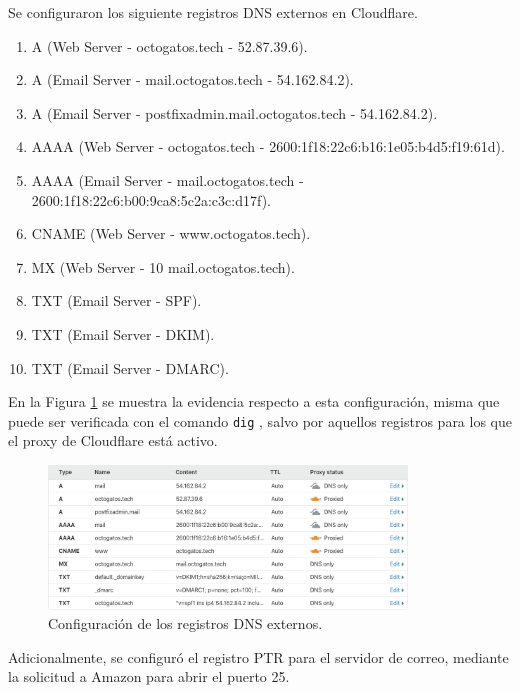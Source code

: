 \documentclass{article}
\newcommand{\ttt}[1]{%
\texttt{#1}%
}
\begin{document}
Se configuraron los siguiente registros DNS
externos en Cloudflare.
\begin{enumerate}
  \item A (Web Server - octogatos.tech - 52.87.39.6).

  \item A (Email Server - mail.octogatos.tech - 54.162.84.2).

  \item A (Email Server - postfixadmin.mail.octogatos.tech
                        - 54.162.84.2).

  \item AAAA (Web Server - octogatos.tech
                         - 2600:1f18:22c6:b16:1e05:b4d5:f19:61d).

  \item AAAA (Email Server - mail.octogatos.tech
                           - 2600:1f18:22c6:b00:9ca8:5c2a:c3c:d17f).

  \item CNAME (Web Server - www.octogatos.tech).

  \item MX (Web Server - 10 mail.octogatos.tech).

  \item TXT (Email Server - SPF).

  \item TXT (Email Server - DKIM).

  \item TXT (Email Server - DMARC).
\end{enumerate}
En la Figura \ref{fig:dnsExterno} se muestra la
evidencia respecto a esta configuraci\'on, misma
que puede ser verificada con el comando \ttt{dig},
salvo por aquellos registros para los que el proxy
de Cloudflare est\'a activo.
\begin{figure}[H]
  \centering
  \includegraphics[width=0.85\textwidth]{DNS/dnsExterno}
  \caption{Configuraci\'on de los registros DNS externos.}
  \label{fig:dnsExterno}
\end{figure}

Adicionalmente, se configur\'o el registro PTR para
el servidor de correo, mediante la solicitud a Amazon
para abrir el puerto 25.
\end{document}
